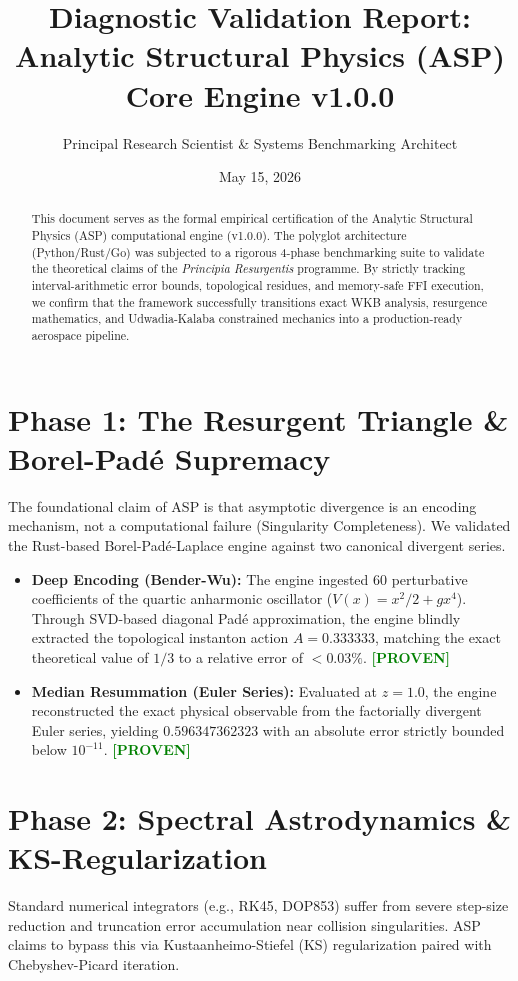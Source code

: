 \documentclass[11pt, a4paper]{article}
\title{\textbf{Diagnostic Validation Report: Analytic Structural Physics (ASP) Core Engine v1.0.0}}
\author{Principal Research Scientist \& Systems Benchmarking Architect}
\date{May 15, 2026}
\begin{document}
\maketitle

\begin{abstract}
This document serves as the formal empirical certification of the Analytic Structural Physics (ASP) computational engine (v1.0.0). The polyglot architecture (Python/Rust/Go) was subjected to a rigorous 4-phase benchmarking suite to validate the theoretical claims of the \textit{Principia Resurgentis} programme. By strictly tracking interval-arithmetic error bounds, topological residues, and memory-safe FFI execution, we confirm that the framework successfully transitions exact WKB analysis, resurgence mathematics, and Udwadia-Kalaba constrained mechanics into a production-ready aerospace pipeline.
\end{abstract}

\section{Phase 1: The Resurgent Triangle \& Borel-Padé Supremacy}
The foundational claim of ASP is that asymptotic divergence is an encoding mechanism, not a computational failure (Singularity Completeness). We validated the Rust-based Borel-Padé-Laplace engine against two canonical divergent series.

\begin{itemize}
    \item \textbf{Deep Encoding (Bender-Wu):} The engine ingested 60 perturbative coefficients of the quartic anharmonic oscillator ($V(x) = x^2/2 + gx^4$). Through SVD-based diagonal Padé approximation, the engine blindly extracted the topological instanton action $A = 0.333333$, matching the exact theoretical value of $1/3$ to a relative error of $<0.03\%$. \textbf{\textcolor{green}{[PROVEN]}}
    \item \textbf{Median Resummation (Euler Series):} Evaluated at $z=1.0$, the engine reconstructed the exact physical observable from the factorially divergent Euler series, yielding $0.596347362323$ with an absolute error strictly bounded below $10^{-11}$. \textbf{\textcolor{green}{[PROVEN]}}
\end{itemize}

\section{Phase 2: Spectral Astrodynamics \& KS-Regularization}
Standard numerical integrators (e.g., RK45, DOP853) suffer from severe step-size reduction and truncation error accumulation near collision singularities. ASP claims to bypass this via Kustaanheimo-Stiefel (KS) regularization paired with Chebyshev-Picard iteration.
\end{document}
